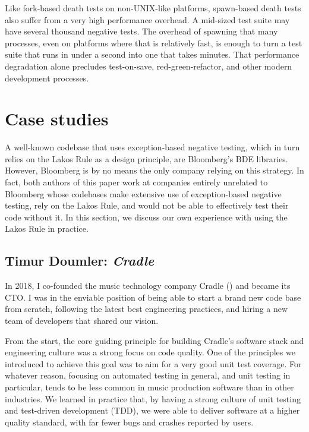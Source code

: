 Like fork-based death tests on non-UNIX-like platforms, spawn-based death tests also suffer from a very high performance overhead. A mid-sized test suite may have several thousand negative tests. The overhead of spawning that many processes, even on platforms where that is relatively fast, is enough to turn a test suite that runs in under a second into one that takes minutes. That performance degradation alone precludes test-on-save, red-green-refactor, and other modern development processes.

\section{Case studies}
\label{sec:casestudies}

A well-known codebase that uses exception-based negative testing, which in turn relies on the Lakos Rule as a design principle, are Bloomberg's BDE libraries. However, Bloomberg is by no means the only company relying on this strategy. In fact, both authors of this paper work at companies entirely unrelated to Bloomberg whose codebases make extensive use of exception-based negative testing, rely on the Lakos Rule, and would not be able to effectively test their code without it. In this section, we discuss our own experience with using the Lakos Rule in practice.

\subsection{Timur Doumler: \emph{Cradle}}

In 2018, I co-founded the music technology company Cradle (\hyperref[https://cradle.app]{}) and became its CTO. I was in the enviable position of being able to start a brand new code base from scratch, following the latest best engineering practices, and hiring a new team of developers that shared our vision.

From the start, the core guiding principle for building Cradle's software stack and engineering culture was a strong focus on code quality. One of the principles we introduced to achieve this goal was to aim for a very good unit test coverage. For whatever reason, focusing on automated testing in general, and unit testing in particular, tends to be less common in  music production software than in other industries. We learned in practice that, by having a strong culture of unit testing and test-driven development (TDD), we were able to deliver software at a higher quality standard, with far fewer bugs and crashes reported by users.

